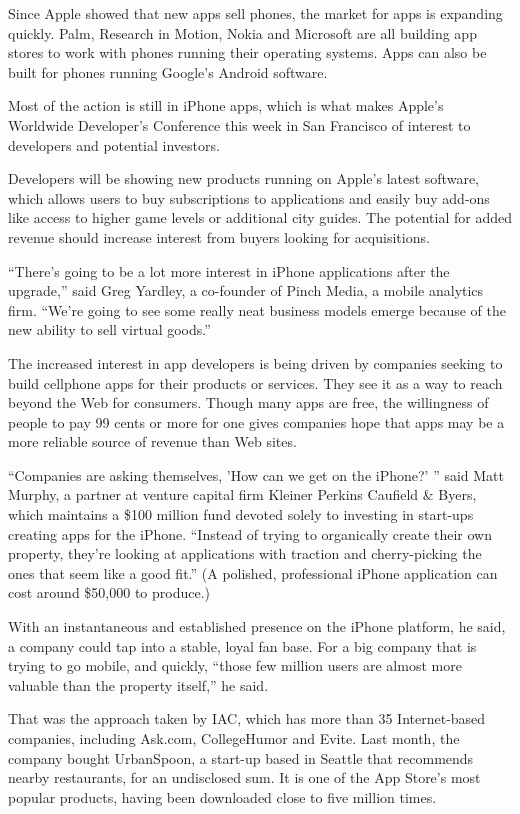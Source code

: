 \documentclass[12pt,a4paper,onecolumn]{article}
\begin{document}
Since Apple showed that new apps sell phones, the market for apps is expanding quickly. Palm,
Research in Motion, Nokia and Microsoft are all building app stores to work with phones running
their operating systems. Apps can also be built for phones running Google's Android software.

Most of the action is still in iPhone apps, which is what makes Apple's Worldwide Developer's
Conference this week in San Francisco of interest to developers and potential investors.

Developers will be showing new products running on Apple's latest software, which allows users to
buy subscriptions to applications and easily buy add-ons like access to higher game levels or
additional city guides. The potential for added revenue should increase interest from buyers looking
for acquisitions.

``There's going to be a lot more interest in iPhone applications after the upgrade,'' said Greg
Yardley, a co-founder of Pinch Media, a mobile analytics firm. ``We're going to see some really neat
business models emerge because of the new ability to sell virtual goods.''

The increased interest in app developers is being driven by companies seeking to build cellphone
apps for their products or services. They see it as a way to reach beyond the Web for consumers.
Though many apps are free, the willingness of people to pay 99 cents or more for one gives companies
hope that apps may be a more reliable source of revenue than Web sites.

``Companies are asking themselves, 'How can we get on the iPhone?' '' said Matt Murphy, a partner at
venture capital firm Kleiner Perkins Caufield \& Byers, which maintains a \$100 million fund devoted
solely to investing in start-ups creating apps for the iPhone. ``Instead of trying to organically
create their own property, they're looking at applications with traction and cherry-picking the ones
that seem like a good fit.'' (A polished, professional iPhone application can cost around \$50,000
to produce.)

With an instantaneous and established presence on the iPhone platform, he said, a company could tap
into a stable, loyal fan base. For a big company that is trying to go mobile, and quickly, ``those
few million users are almost more valuable than the property itself,'' he said.

That was the approach taken by IAC, which has more than 35 Internet-based companies, including
Ask.com, CollegeHumor and Evite. Last month, the company bought UrbanSpoon, a start-up based in
Seattle that recommends nearby restaurants, for an undisclosed sum. It is one of the App Store's
most popular products, having been downloaded close to five million times.
\end{document}
